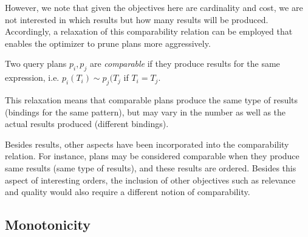 However, we note that given the objectives here are cardinality and cost, we are not interested in which results but how many results will be produced. 
Accordingly, a relaxation of this comparability relation can be employed that enables the optimizer to prune plans
more aggressively.

\begin{definition}
  \label{def:comparability}
  Two query plans $p_i, p_j$ are \emph{comparable} if they produce results for the same expression, i.e. $p_i(T_i) \sim  p_j(T_j$ if $T_i = T_j$. 
\end{definition}

This relaxation means that comparable plans produce the same type of results (bindings for the same pattern), but may vary in the number as well as the actual results produced (different bindings). 

Besides results, other aspects have been incorporated into the comparability relation. For instance, plans may be considered comparable when they produce same results (same type of results), and these results are ordered. 
Besides this aspect of interesting orders, the inclusion of other objectives such as relevance and quality would also require a different notion of comparability.  

\subsection{Monotonicity}
\label{sec:sharing}

